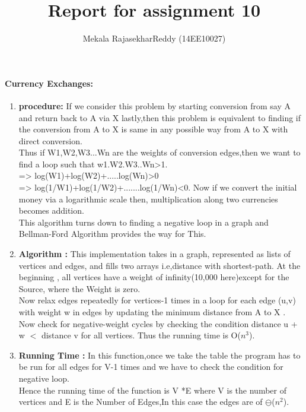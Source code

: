 \documentclass[a4paper,11pt]{article}
\title{Report for assignment 10}
\author{Mekala RajasekharReddy (14EE10027)}
\begin{document}
\maketitle

\paragraph{Currency Exchanges:}
\begin{enumerate}
 \item \textbf{procedure:}
If we consider this problem by starting conversion from say A and return back to A via X lastly,then this problem is equivalent  to finding if the conversion from A to X is same in any possible way from A to X  with direct conversion.\\
 Thus if W1,W2,W3...Wn are the weights of conversion edges,then we want to find a loop such that w1.W2.W3..Wn>1.\\
 =>  log(W1)+log(W2)+.....log(Wn)>0\\
 =>   log(1/W1)+log(1/W2)+.......log(1/Wn)<0.
Now if we convert the initial money via a logarithmic scale then, multiplication along two currencies becomes addition.\\ 
This algorithm turns down to finding a negative loop in a graph and Bellman-Ford Algorithm provides the way for This.
 \item \textbf{Algorithm :}
This implementation takes in a graph, represented as lists of vertices and edges, and fills two arrays  i.e,distance with shortest-path.
 At the beginning , all vertices have a weight of infinity(10,000 here)except for the Source, where the Weight is zero.\\
 Now  relax edges repeatedly for vertices-1 times in a loop for each edge (u,v) with weight w in edges by updating the minimum distance from A to X .\\
 Now check for negative-weight cycles by checking the condition distance u + w $<$ distance v for all vertices.
Thus the running time is  O($n^3$).\\
 \item \textbf{Running Time :}
In this function,once we  take the table the program has to be run for all edges for V-1 times and we have to check the condition for negative loop.\\
Hence the running time of the function is V *E where V is the number of vertices and  E is the Number of Edges,In this case the edges are of $\ominus$($n^2$). \\

\end{enumerate}
\end{document}
